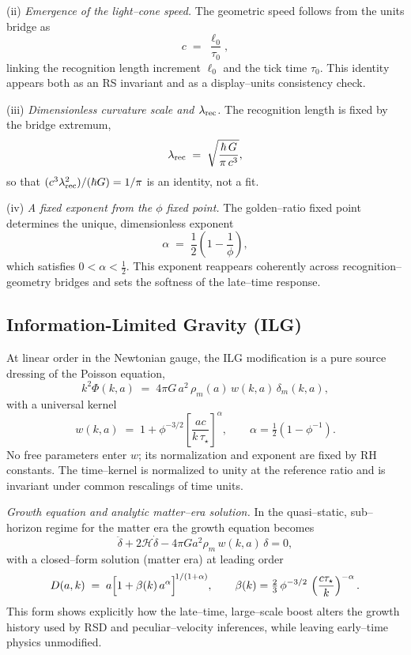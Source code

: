 \documentclass[11pt]{article}
\begin{document}
(ii) \emph{Emergence of the light–cone speed.} The geometric speed follows from the units bridge as
\[
c \;=\; \frac{\ell_0}{\tau_0},
\]
linking the recognition length increment \(\ell_0\) and the tick time \(\tau_0\). This identity appears both as an RS invariant and as a display–units consistency check.

(iii) \emph{Dimensionless curvature scale and \(\lambda_{\rm rec}\).} The recognition length is fixed by the bridge extremum,
\[
\lambda_{\rm rec} \;=\; \sqrt{\frac{\hbar\,G}{\pi\,c^3}},
\]
so that \((c^3 \lambda_{\rm rec}^2)/(\hbar G)=1/\pi\) is an identity, not a fit.

(iv) \emph{A fixed exponent from the \(\phi\) fixed point.} The golden–ratio fixed point determines the unique, dimensionless exponent
\[
\alpha \;=\; \frac12\!\left(1-\frac{1}{\phi}\right),
\]
which satisfies \(0<\alpha<\tfrac12\). This exponent reappears coherently across recognition–geometry bridges and sets the softness of the late–time response.

\subsection{Information-Limited Gravity (ILG)}

At linear order in the Newtonian gauge, the ILG modification is a pure source dressing of the Poisson equation,
\begin{equation}
k^2 \Phi(k,a) \;=\; 4\pi G\,a^2\,\rho_m(a)\,w(k,a)\,\delta_m(k,a),
\end{equation}
with a universal kernel
\begin{equation}
w(k,a) \;=\; 1 + \phi^{-3/2}\!\left[\frac{a c}{k\,\tau_\star}\right]^{\alpha},
\qquad \alpha=\tfrac12\!\left(1-\phi^{-1}\right).
\end{equation}
No free parameters enter \(w\); its normalization and exponent are fixed by RH constants. The time–kernel is normalized to unity at the reference ratio and is invariant under common rescalings of time units.

\medskip
\noindent\textit{Growth equation and analytic matter–era solution.} In the quasi–static, sub–horizon regime for the matter era the growth equation becomes
\[
\ddot\delta + 2\mathcal{H}\dot\delta - 4\pi G a^2 \rho_m\, w(k,a)\,\delta = 0,
\]
with a closed–form solution (matter era) at leading order
\[
D(a,k) \;=\; a\Bigl[1+\beta(k)\,a^{\alpha}\Bigr]^{\!1/(1+\alpha)}, 
\qquad \beta(k)=\tfrac{2}{3}\,\phi^{-3/2}\,\left(\frac{c\tau_\star}{k}\right)^{-\alpha}.
\]
This form shows explicitly how the late–time, large–scale boost alters the growth history used by RSD and peculiar–velocity inferences, while leaving early–time physics unmodified.
\end{document}
